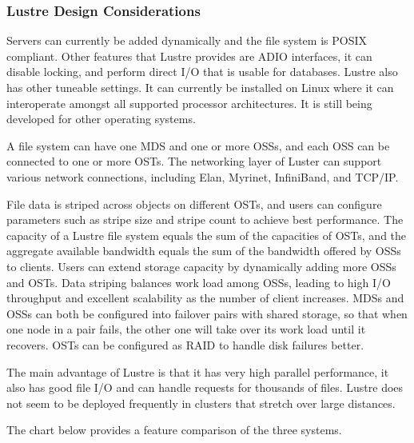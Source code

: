 \documentclass[11pt]{article}
\begin{document}
\subsubsection{Lustre Design Considerations}
Servers can currently be added dynamically and the file system is 
POSIX compliant. Other features that Lustre provides are ADIO 
interfaces, it can disable locking, and perform direct I/O that is 
usable for databases. Lustre also has other tuneable settings. It can 
currently be installed on Linux where it can interoperate amongst all 
supported processor architectures. It is still being developed for 
other operating systems.

A file system can have one MDS and one or more OSSs, and each OSS can 
be connected to one or more OSTs. The networking layer of Luster can 
support various network connections, including Elan, Myrinet, InfiniBand, 
and TCP/IP.

File data is striped across objects on different OSTs, and users can 
configure parameters such as stripe size and stripe count to achieve 
best performance. The capacity of a Lustre file system equals the sum 
of the capacities of OSTs, and the aggregate available bandwidth equals 
the sum of the bandwidth offered by OSSs to clients. Users can extend 
storage capacity by dynamically adding more OSSs and OSTs. Data striping 
balances work load among OSSs, leading to high I/O throughput and 
excellent scalability as the number of client increases. MDSs and OSSs 
can both be configured into failover pairs with shared storage, so that 
when one node in a pair fails, the other one will take over its work load 
until it recovers. OSTs can be configured as RAID to handle disk failures 
better.

The main advantage of Lustre is that it has very high parallel 
performance, it also has good file I/O and can handle requests for 
thousands of files. Lustre does not seem to be deployed frequently 
in clusters that stretch over large distances.

The chart below provides a feature comparison of the three systems.
\end{document}
